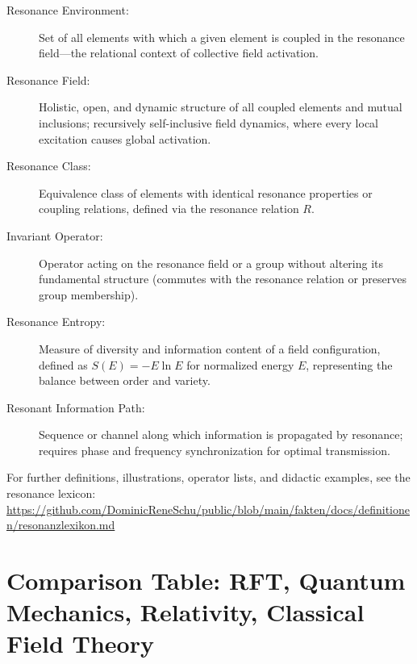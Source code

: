 \documentclass[12pt]{iopart}
\begin{document}
\begin{description}
	\item[Resonance Environment:]  
	Set of all elements with which a given element is coupled in the resonance field—the relational context of collective field activation.
	
	\item[Resonance Field:]  
	Holistic, open, and dynamic structure of all coupled elements and mutual inclusions; recursively self-inclusive field dynamics, where every local excitation causes global activation.
	
	\item[Resonance Class:]  
	Equivalence class of elements with identical resonance properties or coupling relations, defined via the resonance relation $R$.
	
	\item[Invariant Operator:]  
	Operator acting on the resonance field or a group without altering its fundamental structure (commutes with the resonance relation or preserves group membership).
	
	\item[Resonance Entropy:]  
	Measure of diversity and information content of a field configuration, defined as $S(E) = -E \ln E$ for normalized energy $E$, representing the balance between order and variety.
	
	\item[Resonant Information Path:]  
	Sequence or channel along which information is propagated by resonance; requires phase and frequency synchronization for optimal transmission.
	
\end{description}

\noindent
For further definitions, illustrations, operator lists, and didactic examples, see the resonance lexicon:\\
\url{https://github.com/DominicReneSchu/public/blob/main/fakten/docs/definitionen/resonanzlexikon.md}
\newpage


\section*{Comparison Table: RFT, Quantum Mechanics, Relativity, Classical Field Theory}
\end{document}
